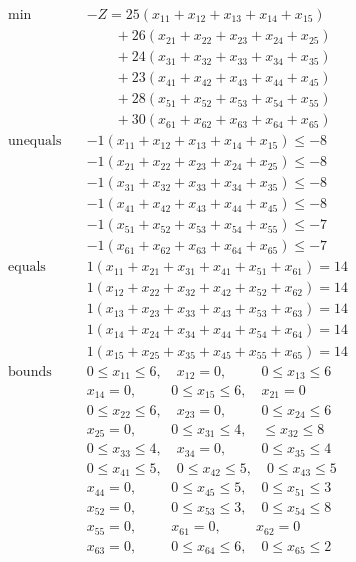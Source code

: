 \documentclass[conference,compsoc]{IEEEtran}
\begin{document}
\begin{equation}
\begin{aligned}
\min \quad & -Z = 25(x_{11} + x_{12} + x_{13} + x_{14} + x_{15}) \\
  &\quad \quad +26(x_{21} + x_{22} + x_{23} + x_{24} + x_{25})\\
  &\quad \quad +24(x_{31} + x_{32} + x_{33} + x_{34} + x_{35})\\
  &\quad \quad +23(x_{41} + x_{42} + x_{43} + x_{44} + x_{45})\\
  &\quad \quad +28(x_{51} + x_{52} + x_{53} + x_{54} + x_{55})\\
  &\quad \quad +30(x_{61} + x_{62} + x_{63} + x_{64} + x_{65})\\
\textrm{unequals} \quad & -1(x_{11} +x_{12} +x_{13} +x_{14} +x_{15}) \leq -8\\
  &-1(x_{21} +x_{22} +x_{23} +x_{24} +x_{25}) \leq -8\\
  &-1(x_{31} +x_{32} +x_{33} +x_{34} +x_{35}) \leq -8\\
  &-1(x_{41} +x_{42} +x_{43} +x_{44} +x_{45}) \leq -8\\
  &-1(x_{51} +x_{52} +x_{53} +x_{54} +x_{55}) \leq -7\\
  &-1(x_{61} +x_{62} +x_{63} +x_{64} +x_{65}) \leq -7\\
\textrm{equals} \quad & 1(x_{11} +x_{21} +x_{31} +x_{41} +x_{51} +x_{61}) = 14\\
  &1(x_{12} +x_{22} +x_{32} +x_{42} +x_{52} +x_{62}) = 14\\
  &1(x_{13} +x_{23} +x_{33} +x_{43} +x_{53} +x_{63}) = 14\\
  &1(x_{14} +x_{24} +x_{34} +x_{44} +x_{54} +x_{64}) = 14\\
  &1(x_{15} +x_{25} +x_{35} +x_{45} +x_{55} +x_{65}) = 14\\
\textrm{bounds} \quad & 0 \leq x_{11} \leq 6,\quad x_{12} = 0,\quad\ \ \quad 0 \leq x_{13} \leq 6 \\
  &x_{14} = 0,\quad\ \ \quad 0 \leq x_{15} \leq 6,\quad x_{21} = 0 \\
  &0 \leq x_{22} \leq 6,\quad x_{23} = 0,\quad\ \ \quad 0 \leq x_{24} \leq 6 \\
  &x_{25} = 0,\quad\ \ \quad 0 \leq x_{31} \leq 4,\quad \leq x_{32} \leq 8 \\
  &0 \leq x_{33} \leq 4,\quad x_{34} = 0,\quad\ \ \quad 0 \leq x_{35} \leq 4 \\
  &0 \leq x_{41} \leq 5,\quad 0 \leq x_{42} \leq 5,\quad 0 \leq x_{43} \leq 5 \\
  &x_{44} = 0,\quad\ \ \quad 0 \leq x_{45} \leq 5,\quad 0 \leq x_{51} \leq 3 \\
  &x_{52} = 0,\quad\ \ \quad 0 \leq x_{53} \leq 3,\quad 0 \leq x_{54} \leq 8 \\
  &x_{55} = 0,\quad\ \ \quad x_{61} = 0,\quad\ \ \quad x_{62} = 0 \\
  &x_{63} = 0,\quad\ \ \quad 0 \leq x_{64} \leq 6,\quad 0 \leq x_{65} \leq 2 \\
\end{aligned}
\end{equation}
\end{document}
